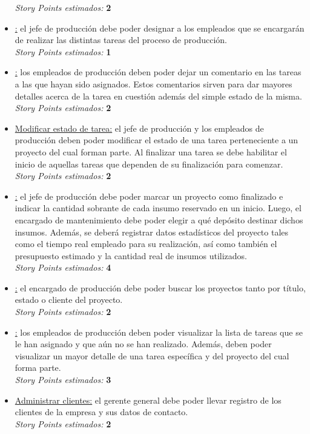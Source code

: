 \documentclass[a4paper, 12pt,twoside]{report}  %
\numberwithin{equation}{subsection} %
\begin{document}
\begin{itemize}
	\textit{Story Points estimados:} \textbf{2}
	\item \underline{:} el jefe de producción debe poder designar a los empleados que se encargarán de realizar las distintas tareas del proceso de producción.\\
	\textit{Story Points estimados:} \textbf{1}
	\item \underline{:} los empleados de producción deben poder dejar un comentario en las tareas a las que hayan sido asignados. Estos comentarios sirven para dar mayores detalles acerca de la tarea en cuestión además del simple estado de la misma.\\
	\textit{Story Points estimados:} \textbf{2}
	\item \underline{Modificar estado de tarea:} el jefe de producción y los empleados de producción deben poder modificar el estado de una tarea perteneciente a un proyecto del cual forman parte. Al finalizar una tarea se debe habilitar el inicio de aquellas tareas que dependen de su finalización para comenzar.\\
	\textit{Story Points estimados:} \textbf{2}
	\item \underline{:} el jefe de producción debe poder marcar un proyecto como finalizado e indicar la cantidad sobrante de cada insumo reservado en un inicio. Luego, el encargado de mantenimiento debe poder elegir a qué depósito destinar dichos insumos. Además, se deberá registrar datos estadísticos del proyecto tales como  el tiempo real empleado para su realización, así como también el presupuesto estimado y la cantidad real de insumos utilizados.\\
	\textit{Story Points estimados:} \textbf{4}
	\item \underline{:} el encargado de producción debe poder buscar los proyectos tanto por título, estado o cliente del proyecto.\\
	\textit{Story Points estimados:} \textbf{2}
	\item \underline{:} los empleados de producción deben poder visualizar la lista de tareas que se le han asignado y que aún no se han realizado. Además, deben poder visualizar un mayor detalle de una tarea específica y del proyecto del cual forma parte.\\
	\textit{Story Points estimados:} \textbf{3}
	\item \underline{Administrar clientes:} el gerente general debe poder llevar registro de los clientes de la empresa y sus datos de contacto.\\
	\textit{Story Points estimados:} \textbf{2}
\end{itemize}
\end{document}
